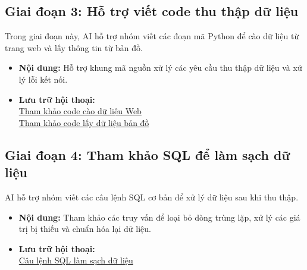 \documentclass[12pt, a4paper]{article}
\begin{document}
\subsection{Giai đoạn 3: Hỗ trợ viết code thu thập dữ liệu}
Trong giai đoạn này, AI hỗ trợ nhóm viết các đoạn mã Python để cào dữ liệu từ trang web và lấy thông tin từ bản đồ.
\begin{itemize}[label=$\bullet$]
    \item \textbf{Nội dung:} Hỗ trợ khung mã nguồn xử lý các yêu cầu thu thập dữ liệu và xử lý lỗi kết nối.
    \item \textbf{Lưu trữ hội thoại:} \\
    \href{https://aistudio.google.com/app/prompts?state=%7B%22ids%22:%5B%2216BqF-fDeiIPEwmq-7ePB756SjpTPirkS%22%5D,%22action%22:%22open%22,%22userId%22:%22103260168952391043836%22,%22resourceKeys%22:%7B%7D%7D&usp=sharing}{Tham khảo code cào dữ liệu Web} \\
    \href{https://aistudio.google.com/app/prompts?state=%7B%22ids%22:%5B%2215sAC-6bKQH-_11Gqrhokz4fbKDKcm8h5%22%5D,%22action%22:%22open%22,%22userId%22:%22103260168952391043836%22,%22resourceKeys%22:%7B%7D%7D&usp=sharing}{Tham khảo code lấy dữ liệu bản đồ}
\end{itemize}

\subsection{Giai đoạn 4: Tham khảo SQL để làm sạch dữ liệu}
AI hỗ trợ nhóm viết các câu lệnh SQL cơ bản để xử lý dữ liệu sau khi thu thập.
\begin{itemize}[label=$\bullet$]
    \item \textbf{Nội dung:} Tham khảo các truy vấn để loại bỏ dòng trùng lặp, xử lý các giá trị bị thiếu và chuẩn hóa lại dữ liệu.
    \item \textbf{Lưu trữ hội thoại:} \\
    \href{https://aistudio.google.com/app/prompts?state=%7B%22ids%22:%5B%221yccOtbr6XtvkGxnmKHPzHSk1v5jOR9xD%22%5D,%22action%22:%22open%22,%22userId%22:%22103260168952391043836%22,%22resourceKeys%22:%7B%7D%7D&usp=sharing}{Câu lệnh SQL làm sạch dữ liệu}
\end{itemize}
\end{document}
